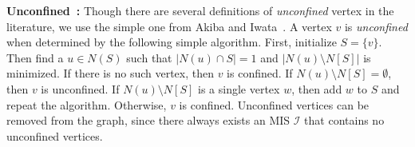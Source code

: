 \documentclass[twoside,leqno,twocolumn]{article}
\newif\ifFull
\begin{document}
\ifFull
\noindent\textbf{Unconfined:} Developed by Xiao and Nagamochi~\cite{Xiao201392}, the unconfined reduction is a generalization of domination and \emph{satellite} reduction rules. A vertex $v$ is said to be unconfined if there exists a set $S$, such that $v\in S$ and $\exists u\in S$ such that $|N(u)\cap S| = 1$ and $N(u) \setminus N[S]$ is empty. Such a vertex is never in a MIS, so it can be removed from the graph.  \\
\else
\noindent\textbf{Unconfined~\cite{Xiao201392}:} Though there are several definitions of \emph{unconfined} vertex in the literature, we use the simple one from Akiba and Iwata~\cite{akiba-tcs-2016}. A vertex $v$ is \emph{unconfined} when determined by the following simple algorithm. First, initialize $S = \{v\}$. Then find a $u \in N(S)$ such that $|N(u) \cap S| = 1$ and $|N(u) \setminus N[S]|$ is minimized. If there is no such vertex, then $v$ is confined. If $N(u) \setminus N[S] = \emptyset$, then $v$ is unconfined.  If $N(u)\setminus N[S]$ is a single vertex $w$, then add $w$ to $S$ and repeat the algorithm. Otherwise, $v$ is confined. Unconfined vertices can be removed from the graph, since there always exists an MIS $\mathcal{I}$ that contains no unconfined vertices. \\
\fi
\end{document}
